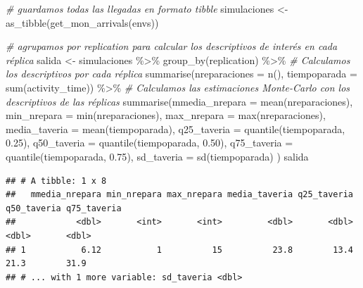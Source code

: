 \documentclass[
]{book}
\newenvironment{Shaded}{\begin{snugshade}}{\end{snugshade}}
\newcommand{\AttributeTok}[1]{\textcolor[rgb]{0.77,0.63,0.00}{#1}}
\newcommand{\CommentTok}[1]{\textcolor[rgb]{0.56,0.35,0.01}{\textit{#1}}}
\newcommand{\FloatTok}[1]{\textcolor[rgb]{0.00,0.00,0.81}{#1}}
\newcommand{\FunctionTok}[1]{\textcolor[rgb]{0.00,0.00,0.00}{#1}}
\newcommand{\NormalTok}[1]{#1}
\newcommand{\OtherTok}[1]{\textcolor[rgb]{0.56,0.35,0.01}{#1}}
\newcommand{\SpecialCharTok}[1]{\textcolor[rgb]{0.00,0.00,0.00}{#1}}
\theoremstyle{definition}
\theoremstyle{definition}
\theoremstyle{definition}
\theoremstyle{definition}
\theoremstyle{remark}
\begin{document}
\begin{Shaded}
\begin{Highlighting}[]
\CommentTok{\# guardamos todas las llegadas en formato \textquotesingle{}tibble\textquotesingle{}}
\NormalTok{simulaciones }\OtherTok{\textless{}{-}} \FunctionTok{as\_tibble}\NormalTok{(}\FunctionTok{get\_mon\_arrivals}\NormalTok{(envs))}

\CommentTok{\# agrupamos por \textquotesingle{}replication\textquotesingle{} para calcular los descriptivos de interés en cada réplica}
\NormalTok{salida }\OtherTok{\textless{}{-}}\NormalTok{ simulaciones }\SpecialCharTok{\%\textgreater{}\%} 
  \FunctionTok{group\_by}\NormalTok{(replication) }\SpecialCharTok{\%\textgreater{}\%} 
  \CommentTok{\# Calculamos los descriptivos por cada réplica}
  \FunctionTok{summarise}\NormalTok{(}\AttributeTok{nreparaciones =} \FunctionTok{n}\NormalTok{(), }
            \AttributeTok{tiempoparada =} \FunctionTok{sum}\NormalTok{(activity\_time)) }\SpecialCharTok{\%\textgreater{}\%} 
  \CommentTok{\# Calculamos las estimaciones Monte{-}Carlo con los descriptivos de las réplicas}
  \FunctionTok{summarise}\NormalTok{(}\AttributeTok{mmedia\_nrepara =} \FunctionTok{mean}\NormalTok{(nreparaciones),}
            \AttributeTok{min\_nrepara =} \FunctionTok{min}\NormalTok{(nreparaciones),}
            \AttributeTok{max\_nrepara =} \FunctionTok{max}\NormalTok{(nreparaciones),}
            \AttributeTok{media\_taveria =} \FunctionTok{mean}\NormalTok{(tiempoparada),}
            \AttributeTok{q25\_taveria =} \FunctionTok{quantile}\NormalTok{(tiempoparada, }\FloatTok{0.25}\NormalTok{),}
            \AttributeTok{q50\_taveria =} \FunctionTok{quantile}\NormalTok{(tiempoparada, }\FloatTok{0.50}\NormalTok{),}
            \AttributeTok{q75\_taveria =} \FunctionTok{quantile}\NormalTok{(tiempoparada, }\FloatTok{0.75}\NormalTok{),}
            \AttributeTok{sd\_taveria =} \FunctionTok{sd}\NormalTok{(tiempoparada) }
\NormalTok{            )}
\NormalTok{salida}
\end{Highlighting}
\end{Shaded}

\begin{verbatim}
## # A tibble: 1 x 8
##   mmedia_nrepara min_nrepara max_nrepara media_taveria q25_taveria q50_taveria q75_taveria
##            <dbl>       <int>       <int>         <dbl>       <dbl>       <dbl>       <dbl>
## 1           6.12           1          15          23.8        13.4        21.3        31.9
## # ... with 1 more variable: sd_taveria <dbl>
\end{verbatim}
\end{document}
